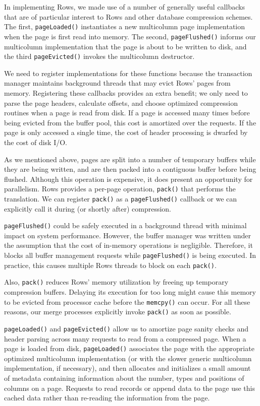 \documentclass{sig-alternate-sigmod08}
\newcommand{\rows}{Rows\xspace}
\newcommand{\rowss}{Rows'\xspace}
\begin{document}
In implementing \rows, we made use of a number of generally useful
callbacks that are of particular interest to \rows and other database
compression schemes.  The first, {\tt pageLoaded()} instantiates a new
multicolumn page implementation when the page is first read into
memory.  The second, {\tt pageFlushed()} informs our multicolumn
implementation that the page is about to be written to disk, and the
third {\tt pageEvicted()} invokes the multicolumn destructor.

We need to register implementations for these functions because the
transaction manager maintains background threads that may evict \rowss
pages from memory.  Registering these callbacks provides an extra
benefit; we only need to parse the page headers, calculate offsets,
and choose optimized compression routines when a page is read from
disk.  If a page is accessed many times before being evicted from the
buffer pool, this cost is amortized over the requests.  If the page is
only accessed a single time, the cost of header processing is dwarfed
by the cost of disk I/O.

As we mentioned above, pages are split into a number of temporary
buffers while they are being written, and are then packed into a
contiguous buffer before being flushed.  Although this operation is
expensive, it does present an opportunity for parallelism.  \rows
provides a per-page operation, {\tt pack()} that performs the
translation.  We can register {\tt pack()} as a {\tt pageFlushed()}
callback or we can explicitly call it during (or shortly after)
compression.

{\tt pageFlushed()} could be safely executed in a background thread
with minimal impact on system performance.  However, the buffer
manager was written under the assumption that the cost of in-memory
operations is negligible.  Therefore, it blocks all buffer management
requests while {\tt pageFlushed()} is being executed.  In practice,
this causes multiple \rows threads to block on each {\tt pack()}.

Also, {\tt pack()} reduces \rowss memory utilization by freeing up
temporary compression buffers.  Delaying its execution for too long
might cause this memory to be evicted from processor cache before the
{\tt memcpy()} can occur.  For all these reasons, our merge processes
explicitly invoke {\tt pack()} as soon as possible.

{\tt pageLoaded()} and {\tt pageEvicted()} allow us to amortize page
sanity checks and header parsing across many requests to read from a
compressed page.  When a page is loaded from disk, {\tt pageLoaded()}
associates the page with the appropriate optimized multicolumn
implementation (or with the slower generic multicolumn implementation,
if necessary), and then allocates and initializes a small amount of
metadata containing information about the number, types and positions
of columns on a page.  Requests to read records or append data to the
page use this cached data rather than re-reading the information from
the page.
\end{document}
